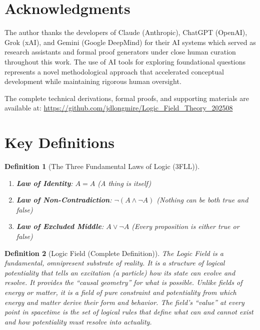 \documentclass[12pt,a4paper]{article}
\newtheorem{definition}{Definition}
\begin{document}
\section*{Acknowledgments}

The author thanks the developers of Claude (Anthropic), ChatGPT (OpenAI), Grok (xAI), and Gemini (Google DeepMind) for their AI systems which served as research assistants and formal proof generators under close human curation throughout this work. The use of AI tools for exploring foundational questions represents a novel methodological approach that accelerated conceptual development while maintaining rigorous human oversight.

The complete technical derivations, formal proofs, and supporting materials are available at: \url{https://github.com/jdlongmire/Logic_Field_Theory_202508}




\appendix

\section{Key Definitions}

\begin{definition}[The Three Fundamental Laws of Logic (3FLL)]
~\\
\begin{enumerate}
\item \textbf{Law of Identity}: $A = A$ (A thing is itself)
\item \textbf{Law of Non-Contradiction}: $\neg(A \land \neg A)$ (Nothing can be both true and false)
\item \textbf{Law of Excluded Middle}: $A \lor \neg A$ (Every proposition is either true or false)
\end{enumerate}
\end{definition}

\begin{definition}[Logic Field (Complete Definition)]
The Logic Field is a fundamental, omnipresent substrate of reality. It is a structure of logical potentiality that tells an excitation (a particle) how its state can evolve and resolve. It provides the ``causal geometry'' for what is possible. Unlike fields of energy or matter, it is a field of pure constraint and potentiality from which energy and matter derive their form and behavior. The field's ``value'' at every point in spacetime is the set of logical rules that define what can and cannot exist and how potentiality must resolve into actuality.
\end{definition}
\end{document}
